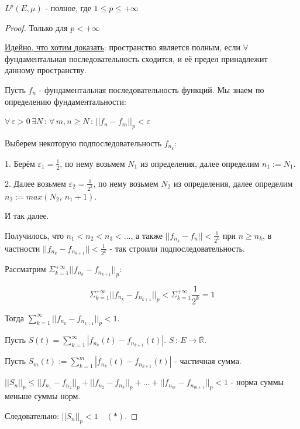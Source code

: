 \begin{theorem}
    $L^p (E, \mu)$ - полное, где $1 \leqslant p \leqslant +\infty$
\end{theorem}

\begin{proof}
    Только для $p < +\infty$

    \underline{Идейно, что хотим доказать}: пространство является полным, если $\forall$ фундаментальная последовательность сходится, и её предел принадлежит данному пространству.

    Пусть $f_n$ - фундаментальная последовательность функций. Мы знаем по определению фундаментальности:

    $\forall \, \varepsilon > 0 \, \exists N \, : \, \forall \, m, n \geqslant N \, : \, ||f_n - f_m||_p < \varepsilon$

    Выберем некоторую подпоследовательность $f_{n_k}$:

    1. Берём $\varepsilon_1 = \frac{1}{2}$, по нему возьмем $N_1$ из определения, далее определим $n_1 := N_1$.

    2. Далее возьмем $\varepsilon_2 = \frac{1}{2^2}$, по нему возьмем $N_2$ из определения, далее определим $n_2 := max(N_2, \ n_1 + 1)$.

    И так далее.\newline

    Получилось, что $n_1 < n_2 < n_3 < \ldots$, а также $||f_{n_k} - f_n|| < \frac{1}{2^k}$ при $n \geqslant n_k$, в частности
    $||f_{n_k} - f_{n_{k + 1}}|| < \frac{1}{2^k}$ - так строили подпоследовательность.

    Рассматрим $\Sigma_{k=1}^{+\infty} || f_{n_k} - f_{n_{k+1}} ||_p$:

    $$ \Sigma_{k=1}^{+\infty} || f_{n_k} - f_{n_{k+1}} ||_p < \Sigma_{k=1}^{+\infty} \frac{1}{2^k} = 1$$

    Тогда $\sum_{k = 1}^\infty ||f_{n_{k}} - f_{n_{k + 1}}||_p < 1$.

    Пусть $S(t) = \sum_{k = 1}^\infty |f_{n_{k}}(t) - f_{n_{k + 1}}(t)|$. $S \, : \, E \to \overline{\mathbb{R}}$.

    Пусть $S_m(t) := \sum_{k = 1}^m |f_{n_{k}}(t) - f_{n_{k + 1}}(t)|$ - частичная сумма.

    $||S_n||_p \leqslant ||f_{n_1} - f_{n_2}||_p + ||f_{n_2} - f_{n_3}||_p + \ldots + ||f_{n_m} - f_{n_{m + 1}}||_p < 1$ - норма суммы меньше суммы норм.

    Следовательно: $||S_n||_p < 1 \quad (*)$.\newline


\end{proof}
